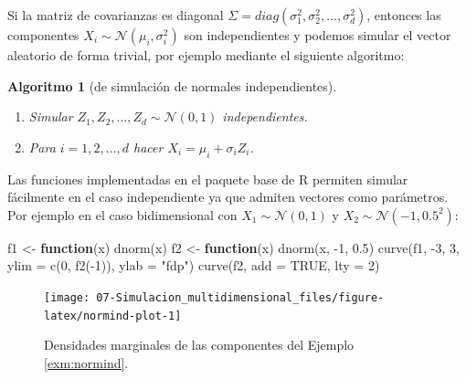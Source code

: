 \documentclass[
]{book}
\newenvironment{Shaded}{\begin{snugshade}}{\end{snugshade}}
\newcommand{\AttributeTok}[1]{\textcolor[rgb]{0.77,0.63,0.00}{#1}}
\newcommand{\ConstantTok}[1]{\textcolor[rgb]{0.00,0.00,0.00}{#1}}
\newcommand{\ControlFlowTok}[1]{\textcolor[rgb]{0.13,0.29,0.53}{\textbf{#1}}}
\newcommand{\DecValTok}[1]{\textcolor[rgb]{0.00,0.00,0.81}{#1}}
\newcommand{\FloatTok}[1]{\textcolor[rgb]{0.00,0.00,0.81}{#1}}
\newcommand{\FunctionTok}[1]{\textcolor[rgb]{0.00,0.00,0.00}{#1}}
\newcommand{\NormalTok}[1]{#1}
\newcommand{\OtherTok}[1]{\textcolor[rgb]{0.56,0.35,0.01}{#1}}
\newcommand{\SpecialCharTok}[1]{\textcolor[rgb]{0.00,0.00,0.00}{#1}}
\newcommand{\StringTok}[1]{\textcolor[rgb]{0.31,0.60,0.02}{#1}}
\theoremstyle{break}
\newtheorem{conjecture}{Algoritmo}[chapter]
\theoremstyle{definition}
\theoremstyle{definition}
\theoremstyle{definition}
\theoremstyle{definition}
\theoremstyle{remark}
\begin{document}
Si la matriz de covarianzas es diagonal \(\Sigma=diag\left( \sigma_1^2,\sigma_2^2,\ldots,\sigma_d^2\right)\),
entonces las componentes \(X_i \sim \mathcal{N}\left( \mu_i,\sigma_i^2\right)\)
son independientes y podemos simular el vector aleatorio de forma trivial, por ejemplo mediante el siguiente algoritmo:

\begin{conjecture}[de simulación de normales independientes]
\protect\hypertarget{cnj:mnorm-indep}{}{\label{cnj:mnorm-indep} {} }

\begin{enumerate}
\def\labelenumi{\arabic{enumi}.}
\item
  Simular \(Z_1, Z_2, \ldots, Z_d \sim \mathcal{N} \left( 0, 1 \right)\) independientes.
\item
  Para \(i = 1, 2, \ldots, d\) hacer \(X_i = \mu_i + \sigma_i Z_i\).
\end{enumerate}
\end{conjecture}

Las funciones implementadas en el paquete base de R permiten simular fácilmente en el caso independiente ya que admiten vectores como parámetros.
Por ejemplo en el caso bidimensional con \(X_1 \sim \mathcal{N}\left( 0, 1\right)\) y \(X_2 \sim \mathcal{N}\left( -1, 0.5^2 \right)\):



\begin{Shaded}
\begin{Highlighting}[]
\NormalTok{f1 }\OtherTok{\textless{}{-}} \ControlFlowTok{function}\NormalTok{(x) }\FunctionTok{dnorm}\NormalTok{(x)}
\NormalTok{f2 }\OtherTok{\textless{}{-}} \ControlFlowTok{function}\NormalTok{(x) }\FunctionTok{dnorm}\NormalTok{(x, }\SpecialCharTok{{-}}\DecValTok{1}\NormalTok{, }\FloatTok{0.5}\NormalTok{)}
\FunctionTok{curve}\NormalTok{(f1, }\SpecialCharTok{{-}}\DecValTok{3}\NormalTok{, }\DecValTok{3}\NormalTok{, }\AttributeTok{ylim =} \FunctionTok{c}\NormalTok{(}\DecValTok{0}\NormalTok{, }\FunctionTok{f2}\NormalTok{(}\SpecialCharTok{{-}}\DecValTok{1}\NormalTok{)), }\AttributeTok{ylab =} \StringTok{"fdp"}\NormalTok{)}
\FunctionTok{curve}\NormalTok{(f2, }\AttributeTok{add =} \ConstantTok{TRUE}\NormalTok{, }\AttributeTok{lty =} \DecValTok{2}\NormalTok{)}
\end{Highlighting}
\end{Shaded}

\begin{figure}[!htb]

{\centering \texttt{[image: 07-Simulacion\_multidimensional\_files/figure-latex/normind-plot-1]} 

}

\caption{Densidades marginales de las componentes del Ejemplo \ref{exm:normind}.}\label{fig:normind-plot}
\end{figure}
\end{document}

